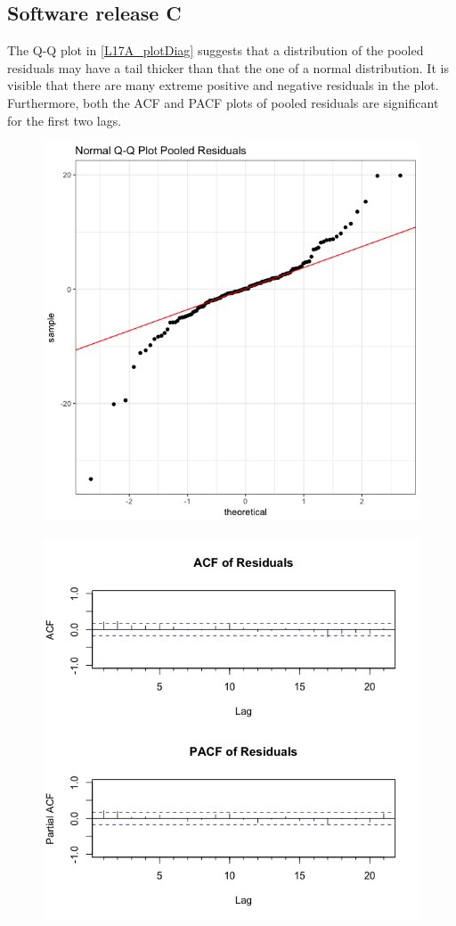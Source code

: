 \subsection{Software release C}

The Q-Q plot in \ref{L17A_plotDiag} suggests that a distribution
of the pooled residuals may have a tail thicker than that the one
of a normal distribution. It is visible that there are many extreme
positive and negative residuals in the plot. Furthermore, both the
ACF and PACF plots of pooled residuals are significant for the first
two lags. 

\begin{figure}[H]
\begin{centering}
\includegraphics[scale=0.3]{picture/L17A_QQPool}$\quad$\includegraphics[scale=0.3]{picture/L17A_ACFPool}

\end{centering}
\end{figure}

